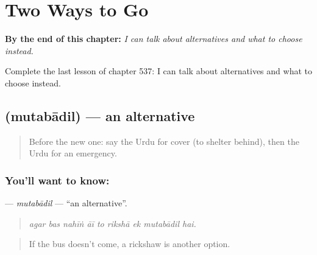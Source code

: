 
\chapter{Two Ways to Go}
\label{ch:ur-two-ways-to-go}

\begin{chapteropening}
\textbf{By the end of this chapter:} \emph{I can talk about alternatives and what to choose instead.}

Complete the last lesson of chapter 537: I can talk about alternatives and what to choose instead.
\end{chapteropening}

\section[\texorpdfstring{\ur{متبادل} (mutabādil)}{متبادل (mutabādil)}]{ (mutabādil) — an alternative}

\label{lesson:UR-C537-mutabadil}



\begin{quote}
Before the new one: say the Urdu for cover (to shelter behind), then the Urdu for an emergency.
\end{quote}

\subsection*{You'll want to know: }
\textbf{} — \emph{mutabādil} — \textquotedblleft{}an alternative\textquotedblright{}.

\begin{quote}
        
\end{quote}

\begin{quote}
\emph{agar bas nahīṅ āī to rikshā ek mutabādil hai.}
\end{quote}

\begin{quote}
If the bus doesn't come, a rickshaw is another option.
\end{quote}


